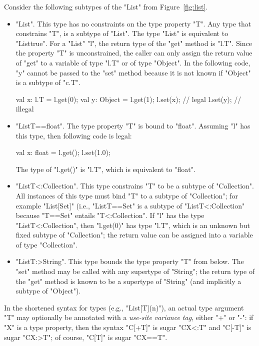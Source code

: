 \documentclass[preprint,nocopyrightspace,9pt]{sigplanconf}
\begin{document}
Consider the following subtypes  of the \xcd"List" from
Figure~\ref{fig:list}.
\begin{itemize}
\item \xcd"List".  This type has no constraints on the type
property \xcd"T".
Any type that constrains \xcd"T",
is a subtype of \xcd"List".  The type \xcd"List" is equivalent to
\xcd"List{true}".
%
For a \xcd"List" \xcd"l", the return type of the \xcd"get" method
is \xcd"l.T".
Since the property \xcd"T" is unconstrained,
the caller can only assign the return value of \xcd"get"
to a variable of type \xcd"l.T" or of type \xcd"Object".
In the following code, \xcd"y" cannot be passed to the \xcd"set" method
because it is not known if \xcd"Object" is a subtype of \xcd"c.T".
\begin{xten}
val x: l.T = l.get(0);
val y: Object = l.get(1);
l.set(x); // legal
l.set(y); // illegal
\end{xten}

\item \xcd"List{T==float}".
The type property \xcd"T" is bound to \xcd"float".
Assuming \xcd"l" has this type, then following code is legal:
\begin{xten}
val x: float = l.get();
l.set(1.0);
\end{xten}
The type of \xcd"l.get()" is \xcd"l.T", which is equivalent to
\xcd"float".

\item \xcd"List{T<:Collection}".
This type constrains \xcd"T" to be a subtype of \xcd"Collection".
All instances of this type must bind \xcd"T" to a subtype of
\xcd"Collection"; for example \xcd"List[Set]" (i.e.,
\xcd"List{T==Set}" is a subtype of
\xcd"List{T<:Collection}" because \xcd"T==Set" entails
\xcd"T<:Collection".
%
If \xcd"l" has the type \xcd"List{T<:Collection}",
then \xcd"l.get(0)" has type \xcd"l.T", which is an unknown but
fixed subtype of \xcd"Collection"; the return value can be
assigned into a variable of type \xcd"Collection".

\item \xcd"List{T:>String}".  This type bounds the type property
\xcd"T"
from below.  The \xcd"set" method may be called with any
supertype of \xcd"String"; the return type of the \xcd"get"
method is known to be a
supertype of \xcd"String" (and implicitly a subtype of \xcd"Object").
\end{itemize}

In the shortened syntax for types (e.g., \xcd"List[T](n)"),
an actual type argument \xcd"T" may optionally
be annotated
with
a \emph{use-site variance tag}, either \xcd"+" or \xcd"-":
if \xcd"X" is a type property, then
the syntax \xcd"C[+T]" is sugar \xcd"C{X<:T}" and
\xcd"C[-T]" is sugar \xcd"C{X:>T}"; of course,
\xcd"C[T]" is sugar \xcd"C{X==T}".
\end{document}
